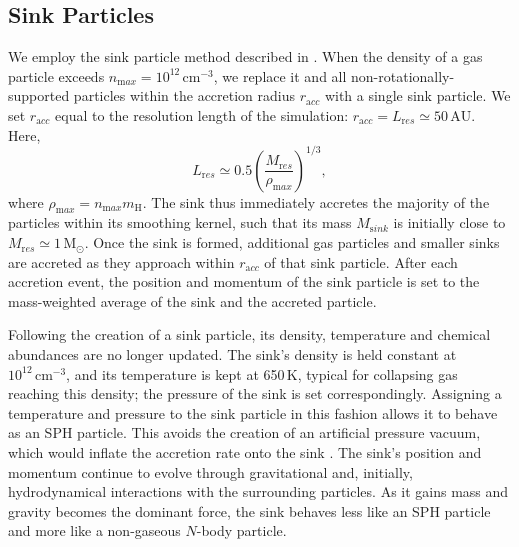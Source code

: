 \documentclass{thesis}
\newcommand{\kelvin}{\ensuremath{\,\mathrm{K}}\xspace}
\newcommand{\cc}{\ensuremath{\,\mathrm{cm}^{-3}}\xspace}
\newcommand{\msun}{\ensuremath{\,\mathrm{M}_{\odot}}\xspace}
\newcommand{\au}{\ensuremath{\,\mathrm{AU}}\xspace}
\begin{document}
\subsection{Sink Particles}
\label{sink_particles}
We employ the sink particle method described in \citet{StacyGreifBromm2010}.  When the density of a gas particle exceeds $n_{\mathrm max} = 10^{12}\cc$, we replace it and all non-rotationally-supported particles within the accretion radius $r_{\mathrm acc}$ with a single sink particle.  We set $r_{\mathrm acc}$ equal to the resolution length of the simulation: $r_{\mathrm acc} = L_{\mathrm res} \simeq 50\au$.  Here, 
\begin{equation}
L_{\mathrm res} \simeq 0.5 \left( \frac{M_{\mathrm res}}{\rho_{\mathrm max}} \right)^{1/3},
\end{equation}
where $\rho_{\mathrm max} = n_{\mathrm max} m_{\mathrm H}$.  The sink thus immediately accretes the majority of the particles within its smoothing kernel, such that its mass $M_{\mathrm sink}$ is initially close to $M_{\mathrm res} \simeq 1\msun$. Once the sink is formed, additional gas particles and smaller sinks are accreted as they approach within $r_{\mathrm acc}$ of that sink particle.  After each accretion event, the position and momentum of the sink particle is set to the mass-weighted average of the sink and the accreted particle.

Following the creation of a sink particle, its density, temperature and chemical abundances are no longer updated. The sink's density is held constant at $10^{12}\cc$, and its temperature is kept at 650\kelvin, typical for collapsing gas reaching this density; the pressure of the sink is set correspondingly. Assigning a temperature and pressure to the sink particle in this fashion allows it to behave as an SPH particle. This  avoids the creation of an artificial pressure vacuum, which would inflate the accretion rate onto the sink \citep[see][]{BrommCoppiLarson2002, MartelEvansShapiro2006}. The sink's position and momentum continue to evolve through gravitational and, initially, hydrodynamical interactions with the surrounding particles. As it gains mass and gravity becomes the dominant force, the sink behaves less like an SPH particle and more like a non-gaseous $N$-body particle.

\end{document}
